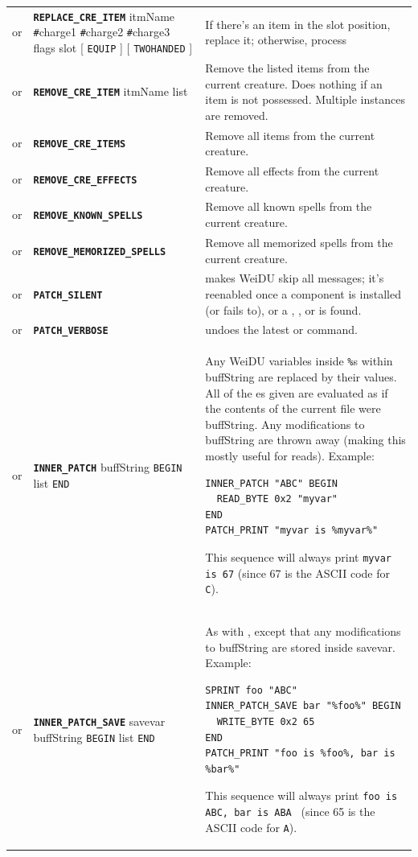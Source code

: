 \documentclass{article}
\def\ttref#1{\ahrefloc{#1}{\tt #1}}
\def\DEFINE#1{{\tt \bf #1}\label{#1}\index{#1}}
\def\t#1{{\tt #1}}
\def\Slist{{\color{red} list }}
\def\Ob{{\color{red} [ }}
\def\Oe{{\color{red} ] }}
\begin{document}
\begin{tabular}{cp{10in}|p{10in}}
or & \DEFINE{REPLACE_CRE_ITEM} itmName \t{\#}charge1 \t{\#}charge2 \t{\#}charge3 flags slot \Ob
\t{EQUIP} \Oe \Ob \t{TWOHANDED} \Oe &
  If there's an item in the slot position, replace it; otherwise, process \ttref{ADD_CRE_ITEM} \\

or & \DEFINE{REMOVE_CRE_ITEM} itmName \Slist &
  Remove the listed items from the current creature. Does nothing if an item is not possessed.
	Multiple instances are removed. \\

or & \DEFINE{REMOVE_CRE_ITEMS} &
  Remove all items from the current creature. \\
or & \DEFINE{REMOVE_CRE_EFFECTS} &
  Remove all effects from the current creature. \\
or & \DEFINE{REMOVE_KNOWN_SPELLS} &
  Remove all known spells from the current creature. \\
or & \DEFINE{REMOVE_MEMORIZED_SPELLS} &
  Remove all memorized spells from the current creature. \\
or & \DEFINE{PATCH_SILENT} & makes WeiDU skip all messages; it's reenabled once a component
    is installed (or fails to), or a \ttref{PRINT}, \ttref{PATCH_PRINT},
    \ttref{VERBOSE} or \ttref{PATCH_VERBOSE} is found. \\
or & \DEFINE{PATCH_VERBOSE} & undoes the latest \ttref{SILENT} or \ttref{PATCH_SILENT} command. \\

or & \DEFINE{INNER_PATCH} buffString \t{BEGIN} \ttref{patch} \Slist \t{END} &
  Any WeiDU variables inside \t{\%}s within buffString are replaced by
  their values. All of the \ttref{patch}es given are evaluated as if the
  contents of the current file were buffString. Any modifications to
  buffString are thrown away (making this mostly useful for reads).
  Example:
\begin{verbatim}
INNER_PATCH "ABC" BEGIN
  READ_BYTE 0x2 "myvar"
END
PATCH_PRINT "myvar is %myvar%"
\end{verbatim}
  This sequence will always print \t{myvar is 67} (since 67 is the ASCII
  code for \t{C}). \\

or & \DEFINE{INNER_PATCH_SAVE} savevar buffString \t{BEGIN} \ttref{patch} \Slist \t{END} &
  As with \ttref{INNER_PATCH}, except that any modifications to buffString are stored inside
  savevar.
  Example:
\begin{verbatim}
SPRINT foo "ABC"
INNER_PATCH_SAVE bar "%foo%" BEGIN
  WRITE_BYTE 0x2 65
END
PATCH_PRINT "foo is %foo%, bar is %bar%"
\end{verbatim}
  This sequence will always print \t{foo is ABC, bar is ABA } (since 65 is the ASCII
  code for \t{A}). \\



\end{tabular}
\end{document}
